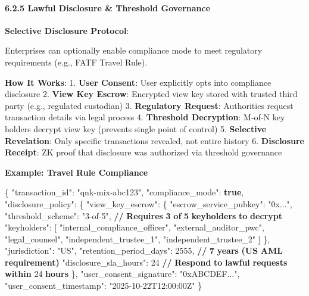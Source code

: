 \documentclass[
  11pt,
]{article}
\newenvironment{Shaded}{\begin{snugshade}}{\end{snugshade}}
\newcommand{\DataTypeTok}[1]{\textcolor[rgb]{0.13,0.29,0.53}{#1}}
\newcommand{\DecValTok}[1]{\textcolor[rgb]{0.00,0.00,0.81}{#1}}
\newcommand{\ErrorTok}[1]{\textcolor[rgb]{0.64,0.00,0.00}{\textbf{#1}}}
\newcommand{\FunctionTok}[1]{\textcolor[rgb]{0.00,0.00,0.00}{#1}}
\newcommand{\KeywordTok}[1]{\textcolor[rgb]{0.13,0.29,0.53}{\textbf{#1}}}
\newcommand{\OtherTok}[1]{\textcolor[rgb]{0.56,0.35,0.01}{#1}}
\newcommand{\StringTok}[1]{\textcolor[rgb]{0.31,0.60,0.02}{#1}}
\begin{document}
\hypertarget{lawful-disclosure-threshold-governance}{%
\paragraph{6.2.5 Lawful Disclosure \& Threshold
Governance}\label{lawful-disclosure-threshold-governance}}

\textbf{Selective Disclosure Protocol}:

Enterprises can optionally enable compliance mode to meet regulatory
requirements (e.g., FATF Travel Rule).

\textbf{How It Works}: 1. \textbf{User Consent}: User explicitly opts
into compliance disclosure 2. \textbf{View Key Escrow}: Encrypted view
key stored with trusted third party (e.g., regulated custodian) 3.
\textbf{Regulatory Request}: Authorities request transaction details via
legal process 4. \textbf{Threshold Decryption}: M-of-N key holders
decrypt view key (prevents single point of control) 5. \textbf{Selective
Revelation}: Only specific transactions revealed, not entire history 6.
\textbf{Disclosure Receipt}: ZK proof that disclosure was authorized via
threshold governance

\textbf{Example: Travel Rule Compliance}

\begin{Shaded}
\begin{Highlighting}[]
\FunctionTok{\{}
  \DataTypeTok{"transaction\_id"}\FunctionTok{:} \StringTok{"qnk{-}mix{-}abc123"}\FunctionTok{,}
  \DataTypeTok{"compliance\_mode"}\FunctionTok{:} \KeywordTok{true}\FunctionTok{,}
  \DataTypeTok{"disclosure\_policy"}\FunctionTok{:} \FunctionTok{\{}
    \DataTypeTok{"view\_key\_escrow"}\FunctionTok{:} \FunctionTok{\{}
      \DataTypeTok{"escrow\_service\_pubkey"}\FunctionTok{:} \StringTok{"0x..."}\FunctionTok{,}
      \DataTypeTok{"threshold\_scheme"}\FunctionTok{:} \StringTok{"3{-}of{-}5"}\FunctionTok{,}  \ErrorTok{//} \ErrorTok{Requires} \ErrorTok{3} \ErrorTok{of} \ErrorTok{5} \ErrorTok{keyholders} \ErrorTok{to} \ErrorTok{decrypt}
      \DataTypeTok{"keyholders"}\FunctionTok{:} \OtherTok{[}
        \StringTok{"internal\_compliance\_officer"}\OtherTok{,}
        \StringTok{"external\_auditor\_pwc"}\OtherTok{,}
        \StringTok{"legal\_counsel"}\OtherTok{,}
        \StringTok{"independent\_trustee\_1"}\OtherTok{,}
        \StringTok{"independent\_trustee\_2"}
      \OtherTok{]}
    \FunctionTok{\},}
    \DataTypeTok{"jurisdiction"}\FunctionTok{:} \StringTok{"US"}\FunctionTok{,}
    \DataTypeTok{"retention\_period\_days"}\FunctionTok{:} \DecValTok{2555}\FunctionTok{,}  \ErrorTok{//} \ErrorTok{7} \ErrorTok{years} \ErrorTok{(US} \ErrorTok{AML} \ErrorTok{requirement)}
    \DataTypeTok{"disclosure\_sla\_hours"}\FunctionTok{:} \DecValTok{24}  \ErrorTok{//} \ErrorTok{Respond} \ErrorTok{to} \ErrorTok{lawful} \ErrorTok{requests} \ErrorTok{within} \DecValTok{24} \ErrorTok{hours}
  \FunctionTok{\},}
  \DataTypeTok{"user\_consent\_signature"}\FunctionTok{:} \StringTok{"0xABCDEF..."}\FunctionTok{,}
  \DataTypeTok{"user\_consent\_timestamp"}\FunctionTok{:} \StringTok{"2025{-}10{-}22T12:00:00Z"}
\FunctionTok{\}}
\end{Highlighting}
\end{Shaded}
\end{document}
